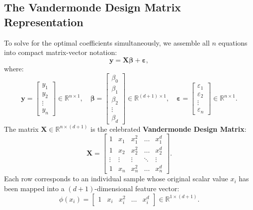 \documentclass[11pt,a4paper]{article}
\numberwithin{equation}{section}
\newcommand{\RR}{\mathbb{R}}
\newcommand{\X}{\mathbf{X}}
\newcommand{\y}{\mathbf{y}}
\newcommand{\bta}{\boldsymbol{\beta}}
\newcommand{\eps}{\boldsymbol{\varepsilon}}
\begin{document}
\subsection{The Vandermonde Design Matrix Representation}
To solve for the optimal coefficients simultaneously, we assemble all $n$ equations into compact matrix-vector notation:
\begin{equation}
  \y = \X \bta + \eps,
  \label{eq:matrix_poly_model}
\end{equation}
where:
\begin{equation}
  \y = \begin{bmatrix} y_1 \\ y_2 \\ \vdots \\ y_n \end{bmatrix} \in \RR^{n \times 1}, \quad
  \bta = \begin{bmatrix} \beta_0 \\ \beta_1 \\ \beta_2 \\ \vdots \\ \beta_d \end{bmatrix} \in \RR^{(d+1) \times 1}, \quad
  \eps = \begin{bmatrix} \varepsilon_1 \\ \varepsilon_2 \\ \vdots \\ \varepsilon_n \end{bmatrix} \in \RR^{n \times 1}.
\end{equation}
The matrix $\X \in \RR^{n \times (d+1)}$ is the celebrated \textbf{Vandermonde Design Matrix}:
\begin{equation}
  \X = \begin{bmatrix}
    1 & x_1 & x_1^2 & \dots & x_1^d \\
    1 & x_2 & x_2^2 & \dots & x_2^d \\
    \vdots & \vdots & \vdots & \ddots & \vdots \\
    1 & x_n & x_n^2 & \dots & x_n^d
  \end{bmatrix}.
  \label{eq:vandermonde}
\end{equation}
Each row corresponds to an individual sample whose original scalar value $x_i$ has been mapped into a $(d+1)$-dimensional feature vector:
\begin{equation}
  \phi(x_i) = \begin{bmatrix} 1 & x_i & x_i^2 & \dots & x_i^d \end{bmatrix} \in \RR^{1 \times (d+1)}.
\end{equation}
\end{document}

